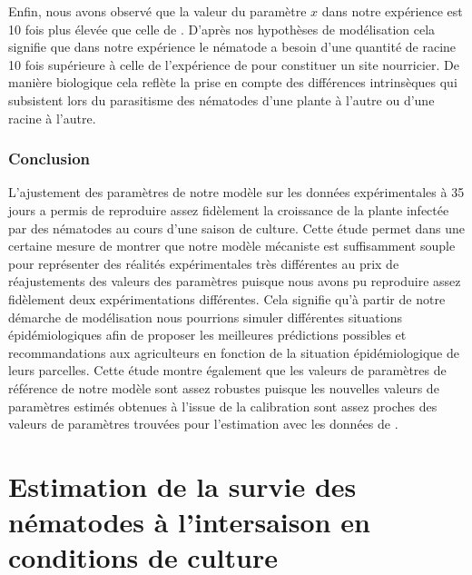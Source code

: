 	 Enfin, nous avons observé que la valeur du paramètre $x$ dans notre expérience est 10 fois plus élevée que celle de \citet{Ehwaeti1998}. D'après nos hypothèses de modélisation cela  signifie que dans notre expérience le nématode  a besoin d'une quantité de racine 10 fois supérieure  à celle de l'expérience de \citet{Ehwaeti1998} pour constituer un site nourricier. De manière biologique cela reflète la prise en compte des différences intrinsèques qui subsistent  lors du parasitisme  des nématodes d'une plante à l'autre ou d'une racine à l'autre.
	
	\subsubsection{Conclusion} 
	 L’ajustement des paramètres de notre modèle sur les données expérimentales à 35 jours a permis de
reproduire assez fidèlement la croissance de la plante infectée par des nématodes au cours d’une saison de
culture.  Cette étude permet dans une certaine mesure de montrer que notre modèle mécaniste est suffisamment souple pour représenter des réalités expérimentales très différentes au prix de réajustements des valeurs des paramètres  puisque nous avons pu reproduire assez fidèlement deux expérimentations différentes. Cela signifie qu'à partir de notre démarche de modélisation nous pourrions simuler différentes situations épidémiologiques afin  de proposer les meilleures prédictions possibles et recommandations aux agriculteurs en fonction de la situation épidémiologique de leurs parcelles. Cette étude montre également que les valeurs de paramètres de référence   de notre modèle sont assez robustes puisque les nouvelles valeurs de paramètres estimés obtenues à l'issue de la calibration sont assez proches des valeurs de paramètres trouvées pour l'estimation avec les données de \citet{Ehwaeti1998}. 
	
\section{ Estimation de la survie des nématodes à l'intersaison en conditions de culture} 
	

